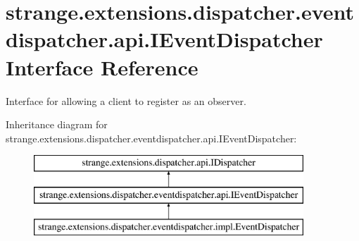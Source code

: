 \hypertarget{interfacestrange_1_1extensions_1_1dispatcher_1_1eventdispatcher_1_1api_1_1_i_event_dispatcher}{\section{strange.\-extensions.\-dispatcher.\-eventdispatcher.\-api.\-I\-Event\-Dispatcher Interface Reference}
\label{interfacestrange_1_1extensions_1_1dispatcher_1_1eventdispatcher_1_1api_1_1_i_event_dispatcher}
}


Interface for allowing a client to register as an observer.  


Inheritance diagram for strange.\-extensions.\-dispatcher.\-eventdispatcher.\-api.\-I\-Event\-Dispatcher\-:\begin{figure}[H]
\begin{center}
\leavevmode
\includegraphics[height=3.000000cm]{interfacestrange_1_1extensions_1_1dispatcher_1_1eventdispatcher_1_1api_1_1_i_event_dispatcher}
\end{center}
\end{figure}
